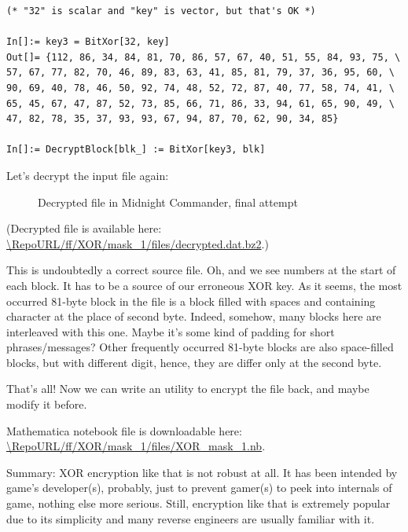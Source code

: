 \begin{lstlisting}[style=custommath]
(* "32" is scalar and "key" is vector, but that's OK *)

In[]:= key3 = BitXor[32, key]
Out[]= {112, 86, 34, 84, 81, 70, 86, 57, 67, 40, 51, 55, 84, 93, 75, \
57, 67, 77, 82, 70, 46, 89, 83, 63, 41, 85, 81, 79, 37, 36, 95, 60, \
90, 69, 40, 78, 46, 50, 92, 74, 48, 52, 72, 87, 40, 77, 58, 74, 41, \
65, 45, 67, 47, 87, 52, 73, 85, 66, 71, 86, 33, 94, 61, 65, 90, 49, \
47, 82, 78, 35, 37, 93, 93, 67, 94, 87, 70, 62, 90, 34, 85}

In[]:= DecryptBlock[blk_] := BitXor[key3, blk]
\end{lstlisting}

Let's decrypt the input file again:

\begin{figure}[H]
\centering
{}
\caption{Decrypted file in Midnight Commander, final attempt}
\end{figure}

(Decrypted file is available here:
\url{\RepoURL/ff/XOR/mask_1/files/decrypted.dat.bz2}.)

This is undoubtedly a correct source file.
Oh, and we see numbers at the start of each block. It has to be a source of our erroneous XOR key.
As it seems, the most occurred 81-byte block in the file is a block filled with spaces and containing  character at the place of second byte.
Indeed, somehow, many blocks here are interleaved with this one.
Maybe it's some kind of padding for short phrases/messages?
Other frequently occurred 81-byte blocks are also space-filled blocks, but with different digit,
hence, they are differ only at the second byte.

That's all! Now we can write an utility to encrypt the file back, and maybe modify it before.

Mathematica notebook file is downloadable here:\\
\url{\RepoURL/ff/XOR/mask_1/files/XOR_mask_1.nb}.

Summary: XOR encryption like that is not robust at all. It has been intended by game's developer(s), probably, just to prevent gamer(s) to peek into internals of game, nothing else more serious.
Still, encryption like that is extremely popular due to its simplicity and many reverse engineers are usually familiar with it.

